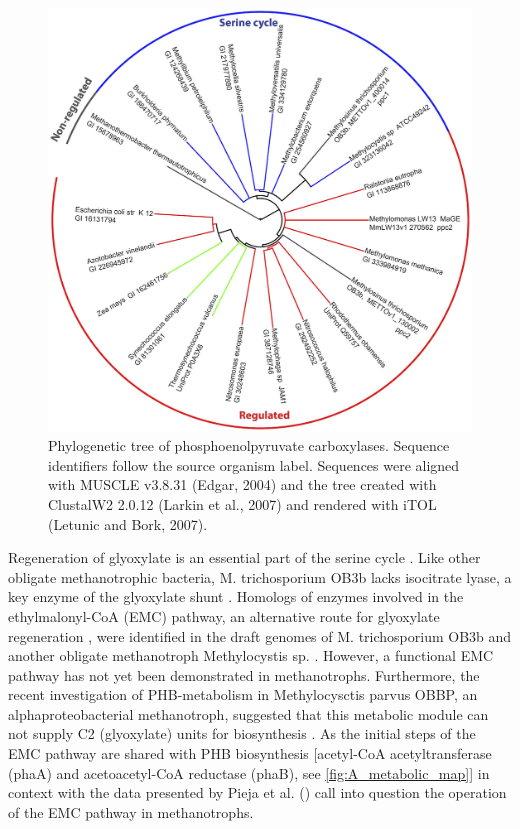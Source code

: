 \begin{figure}[H]
\centering
     \includegraphics[width=1.0\textwidth]{./tex/chapter1/figures/figure3.png}
     \begin{singlespace}
     \caption{Phylogenetic tree of phosphoenolpyruvate carboxylases.
        Sequence identifiers follow the source organism label. Sequences were aligned with MUSCLE v3.8.31 (Edgar, 2004) and
        the tree created with ClustalW2 2.0.12 (Larkin et al., 2007) and rendered with iTOL (Letunic and Bork, 2007).}
     \end{singlespace}
     \label{fig:B_pep}
\end{figure}

Regeneration of glyoxylate is an essential part of the serine cycle \cite{anthony1982, anthony2011, peyraud2009}.
Like other obligate methanotrophic bacteria, M. trichosporium OB3b lacks isocitrate lyase, a key enzyme of the glyoxylate shunt \cite{trotsenko2008}.
Homologs of enzymes involved in the ethylmalonyl-CoA (EMC) pathway, an alternative route for glyoxylate regeneration \cite{peyraud2009}, were identified in the draft genomes of M. trichosporium OB3b and another obligate methanotroph Methylocystis sp. \cite{stein2010, stein2011}.
However, a functional EMC pathway has not yet been demonstrated in methanotrophs.
Furthermore, the recent investigation of PHB-metabolism in Methylocysctis parvus OBBP, an alphaproteobacterial methanotroph, suggested that this metabolic module can not supply C2 (glyoxylate) units for biosynthesis \cite{pieja2011}.
As the initial steps of the EMC pathway are shared with PHB biosynthesis [acetyl-CoA acetyltransferase (phaA) and acetoacetyl-CoA reductase (phaB), see \ref{fig:A_metabolic_map}] in context with the data presented by Pieja et al. (\cite{pieja2011}) call into question the operation of the EMC pathway in methanotrophs.

